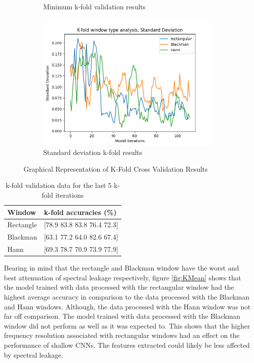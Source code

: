 \documentclass[class=report,11pt,crop=false]{standalone}
\begin{document}
\begin{figure}[ht]
\begin{subfigure}[b]{0.5\textwidth}
        \caption{Minimum k-fold validation results}
        \label{fig:KMin}
    \end{subfigure}
    \hfill
    \begin{subfigure}[b]{0.5\textwidth}
        \includegraphics[width=\linewidth]{Images/kfoldStandard Deviation.png}
        \caption{Standard deviation k-fold results}
        \label{fig:KStd}
    \end{subfigure}
    \caption{Graphical Representation of K-Fold Cross Validation Results}
    \label{fig:K-Fold}
\end{figure}

\begin{table}[h]
\centering
\begin{tabular}{|l|l|}
\hline
\textbf{Window} & \textbf{k-fold accuracies (\%)} \\
\hline
Rectangle & [78.9 83.8 83.8 76.4 72.3] \\
Blackman & [63.1 77.2 64.0 82.6 67.4] \\
Hann & [69.3 78.7 70.9 73.9 77.9] \\
\hline
\end{tabular}
\caption{k-fold validation data for the last 5 k-fold iterations}
\label{tab:k-fold-average}
\end{table}

Bearing in mind that the rectangle and Blackman window have the worst and best attenuation of spectral leakage respectively, figure \ref{fig:KMean} shows that the model trained with data processed with the rectangular window had the highest average accuracy in comparison to the data processed with the Blackman and Hann windows. Although, the data processed with the Hann window was not far off comparison. The model trained with data processed with the Blackman window did not perform as well as it was expected to. This shows that the higher frequency resolution associated with rectangular windows had an effect on the performance of shallow CNNs. The features extracted could likely be less affected by spectral leakage.
\end{document}
